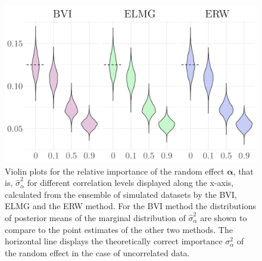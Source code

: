 \begin{figure}[ht]
  \centering
  \includegraphics[width=0.7\linewidth]{Figures/ViolinPlots/Variance_gamma.png}
  \caption[Relative importance of the random effect $\boldsymbol{\alpha}$ in Gaussian LMM]{Violin plots for the relative importance of the random effect $\boldsymbol{\alpha}$, that is, $\hat{\sigma}^2_{\alpha}$ for different correlation levels displayed along the x-axis, calculated from the ensemble of simulated datasets by the BVI, ELMG and the ERW method. For the BVI method the distributions of posterior means of the marginal distribution of $\hat{\sigma}^2_{\alpha}$ are shown to compare to the point estimates of the other two methods. The horizontal line displays the theoretically correct importance $\sigma^2_{\alpha}$ of the random effect in the case of uncorrelated data.}
  \label{fig:relimp_alpha}
\end{figure}

